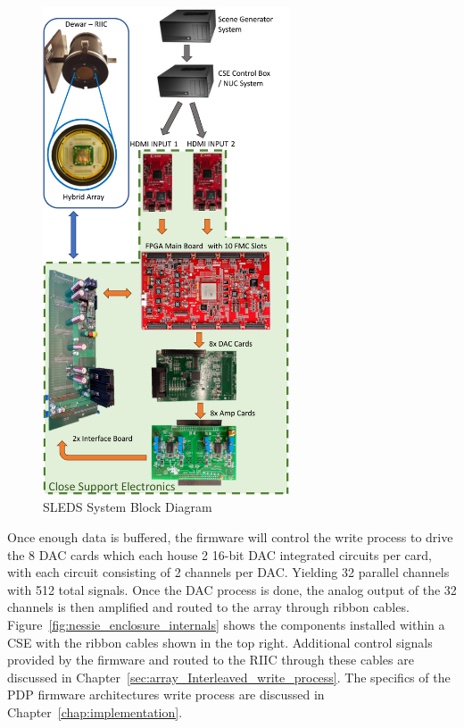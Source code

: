     \begin{figure}
        \centering
        \includegraphics[width=0.65\textwidth]{fig/sleds_block.pdf}
        \caption{SLEDS System Block Diagram}
        \label{fig:sleds_block}
    \end{figure}

    Once enough data is buffered, the firmware will control the write process to drive the 8 DAC cards which each house 2 16-bit DAC integrated circuits per card, with each circuit consisting of 2 channels per DAC. Yielding 32 parallel channels with 512 total signals. Once the DAC process is done, the analog output of the 32 channels is then amplified and routed to the array through ribbon cables. Figure~\ref{fig:nessie_enclosure_internals} shows the components installed within a CSE with the ribbon cables shown in the top right. Additional control signals provided by the firmware and routed to the RIIC through these cables are discussed in Chapter~\ref{sec:array_Interleaved_write_process}. The specifics of the PDP firmware architectures write process are discussed in Chapter~\ref{chap:implementation}.

